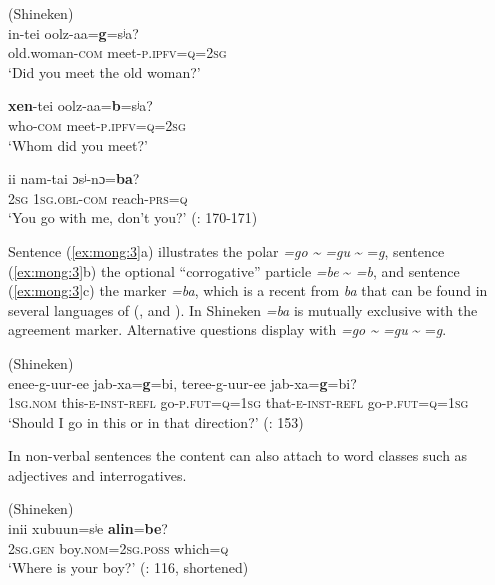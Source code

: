 \ea%
    \label{ex:mong:3}
     (Shineken)\\
    \ea
    in-tei    oolz-aa=\textbf{{g}}=sʲ{a?}\\
    old.woman-\textsc{com}  meet-\textsc{p.ipfv}=\textsc{q}=2\textsc{sg}\\
    \glt ‘Did you meet the old woman?’
    
    \ex
    \gll \textbf{{xen}}-tei    oolz-aa=\textbf{{b}}{=sʲ}{a?}\\
    who-\textsc{com}  meet-\textsc{p.ipfv}=\textsc{q}=2\textsc{sg}\\
    \glt ‘Whom did you meet?’
    
    \ex
    ii  nam-tai  ɔsʲ-nɔ=\textbf{{ba}}?\\
    2\textsc{sg}  1\textsc{sg}.\textsc{obl}-\textsc{com}  reach-\textsc{prs}=\textsc{q}\\
    \glt ‘You go with me, don’t you?’ (\citealt{Yamakoshi2011a}: 170-171)
    \z
    \z 

\noindent Sentence (\ref{ex:mong:3}a) illustrates the polar  \textit{=go {\textasciitilde} =gu} {\textasciitilde} =\textit{g}, sentence (\ref{ex:mong:3}b) the optional “corrogative” particle \textit{=be} {\textasciitilde} \textit{=b}, and sentence (\ref{ex:mong:3}c) the marker \textit{=ba}, which is a recent  from  \textit{ba}  that can be found in several languages of  (, and ). In Shineken  \textit{=ba} is mutually exclusive with the agreement marker. Alternative questions display  with \textit{=go {\textasciitilde} =gu} {\textasciitilde} =\textit{g}.

\ea%
    \label{ex:mong:4}
     (Shineken)\\
     {enee-g-uur-ee} {jab-xa=}\textbf{{g}}=bi, teree-g-uur-ee jab-xa=\textbf{{g}}{=bi?}\\
    1\textsc{sg.nom}  this-\textsc{e}-\textsc{inst}-\textsc{refl}  go-\textsc{p.fut}=\textsc{q}=1\textsc{sg} that-\textsc{e}-\textsc{inst}-\textsc{refl}  go-\textsc{p.fut}=\textsc{q}=1\textsc{sg}\\
    \glt ‘Should I go in this or in that direction?’ (\citealt{Yamakoshi2006}: 153)
    \z

In non-verbal sentences the content  can also attach to word classes such as adjectives and interrogatives.

\ea%
    \label{ex:mong:5}
     (Shineken)\\
    \ea
    inii xubuun=sʲe \textbf{{alin}}=\textbf{{be}}?\\
    2\textsc{sg.gen} boy.\textsc{nom}=2\textsc{sg}.\textsc{poss}  which=\textsc{q}\\
    \glt ‘Where is your boy?’ (\citealt{Yamakoshi2011b}: 116, shortened)
    
